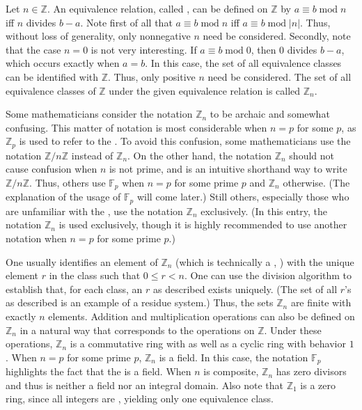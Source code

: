 \documentclass[12pt]{article}
\begin{document}

Let $n \in \mathbb{Z}$.  An equivalence relation, called , can be defined on $\mathbb{Z}$ by $a \equiv b \operatorname{mod} n$ iff $n$ divides $b-a$.  Note first of all that $a \equiv b \operatorname{mod} n$ iff $a \equiv b \operatorname{mod} |n|$.  Thus, without loss of generality, only nonnegative $n$ need be considered.  Secondly, note that the case $n=0$ is not very interesting.  If $a \equiv b \operatorname{mod} 0$, then $0$ divides $b-a$, which occurs exactly when $a=b$.  In this case, the set of all equivalence classes can be identified with $\mathbb{Z}$.  Thus, only positive $n$ need be considered.  The set of all equivalence classes of $\mathbb{Z}$ under the given equivalence relation is called ${\mathbb{Z}}_n$.

Some mathematicians consider the notation ${\mathbb{Z}}_n$ to be archaic and somewhat confusing.  This matter of notation is most considerable when $n=p$ for some  $p$, as ${\mathbb{Z}}_p$ is used to refer to the .   To avoid this confusion, some mathematicians use the notation $\mathbb{Z}/n\mathbb{Z}$ instead of ${\mathbb{Z}}_n$.  On the other hand, the notation ${\mathbb{Z}}_n$ should not cause confusion when $n$ is not prime, and is an intuitive shorthand way to write $\mathbb{Z}/n\mathbb{Z}$.  Thus, others use ${\mathbb{F}}_p$ when $n=p$ for some prime $p$ and ${\mathbb{Z}}_n$ otherwise.  (The explanation of the usage of $\mathbb{F}_p$ will come later.)  Still others, especially those who are unfamiliar with the , use the notation ${\mathbb{Z}}_n$ exclusively.  (In this entry, the notation ${\mathbb{Z}}_n$ is used exclusively, though it is highly recommended to use another notation when $n=p$ for some prime $p$.)

One usually identifies an element of ${\mathbb{Z}}_n$ (which is technically a , ) with the unique element $r$ in the class such that $0 \le r < n$.  One can use the division algorithm to establish that, for each class, an $r$ as described exists uniquely.  (The set of all $r$'s as described is an example of a residue system.)  Thus, the sets ${\mathbb{Z}}_n$ are finite with exactly $n$ elements.  Addition and multiplication operations can also be defined on ${\mathbb{Z}}_n$ in a natural way that corresponds to the operations on $\mathbb{Z}$.  Under these operations, ${\mathbb{Z}}_n$ is a commutative ring with  as well as a cyclic ring with behavior $1$.  When $n=p$ for some prime $p$, ${\mathbb{Z}}_n$ is a field.  In this case, the notation ${\mathbb{F}}_p$ highlights the fact that the  is a field.  When $n$ is composite, ${\mathbb{Z}}_n$ has zero divisors and thus is neither a field nor an integral domain.  Also note that ${\mathbb{Z}}_1$ is a zero ring, since all integers are , yielding only one equivalence class.
\end{document}
